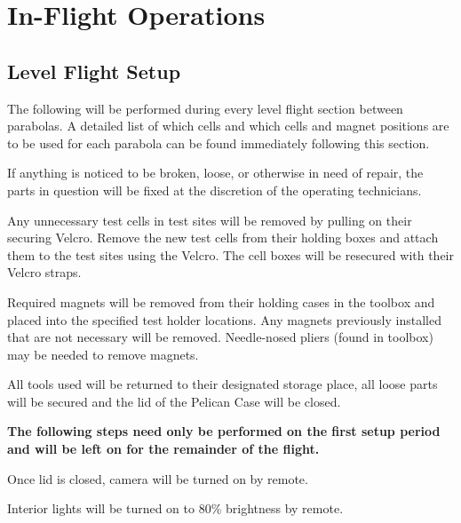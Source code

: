 \newpage{}
\section{In-Flight Operations}
\subsection{Level Flight Setup}
The following will be performed during every level flight section between
parabolas.  A detailed list of which cells and which cells and magnet positions
are to be used for each parabola can be found immediately following this
section. 
\begin{checklist}
    \item If anything is noticed to be broken, loose, or otherwise in need of repair, the parts in question will be fixed at the discretion of the operating technicians. 
    \item Any unnecessary test cells in test sites will be removed by pulling on their securing Velcro.  Remove the new test cells from their holding boxes and attach them to the test sites using the Velcro.  The cell boxes will be resecured with their Velcro straps. 
    \item Required magnets will be removed from their holding cases in the toolbox and placed into the specified test holder locations. Any magnets previously installed that are not necessary will be removed.  Needle-nosed pliers (found in toolbox) may be needed to remove magnets. 
    \item All tools used will be returned to their designated storage place, all loose parts will be secured and the lid of the Pelican Case will be closed. 
\end{checklist}
\textbf{The following steps need only be performed on the first setup period and will be left on for the remainder of the flight.}
\begin{checklist}
    \item Once lid is closed, camera will be turned on by remote.
    \item Interior lights will be turned on to 80\% brightness by remote. 
\end{checklist}

